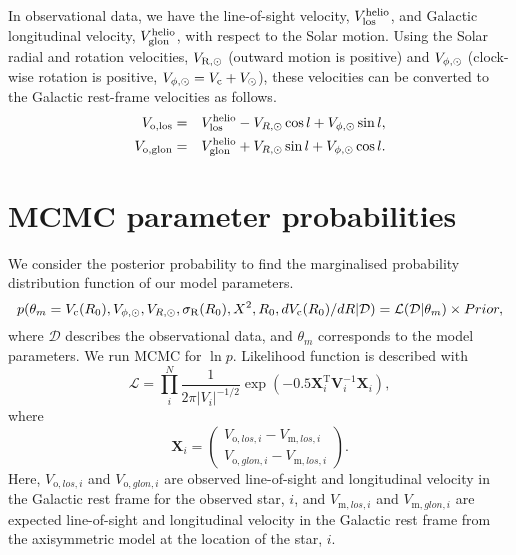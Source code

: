 \documentclass[11pt,a4paper]{article}
\begin{document}
In observational data, we have the line-of-sight velocity, $V_{\rm los}^{\rm helio}$, and Galactic longitudinal velocity, $V_{\rm glon}^{\rm helio}$, with respect to the Solar motion. Using the Solar radial and rotation velocities, $V_{\rm R,\odot}$ (outward motion is positive) and $V_{\rm \phi,\odot}$ (clock-wise rotation is positive, $V_{\rm \phi,\odot}=V_{\rm c}+V_{\odot}$), these velocities can be converted to the Galactic rest-frame velocities as follows.
\begin{eqnarray}
V_{\rm o,los} & = & V_{\rm los}^{\rm helio} - V_{R,\odot} \cos l + V_{\rm \phi,\odot} \sin l, \\
V_{\rm o,glon} & = & V_{\rm glon}^{\rm helio} + V_{R,\odot} \sin l + V_{\rm \phi,\odot} \cos l.
\end{eqnarray}

\section{MCMC parameter probabilities}

We consider the posterior probability to find the marginalised probability distribution function of our model parameters.
\begin{equation}
 p(\theta_m=V_{\rm c}(R_0), V_{\phi,\odot}, V_{R,\odot}, \sigma_{\rm R}(R_0), X^2, R_0, dV_{\rm c}(R_0)/dR| \mathcal{D})
 = \mathcal L(\mathcal{D}|\theta_m) \times Prior,
\end{equation} 
where $\mathcal{D}$ describes the observational data, and $\theta_m$ corresponds to the model parameters. We run MCMC for $\ln p$. Likelihood function is described with 
\begin{equation}
\mathcal{L}=\prod_i^N \frac{1}{2 \pi |V_i|^{-1/2}} 
 \exp\left(-0.5 \bm{X}^{\mathrm T}_i \bm{V}_i^{-1} \bm{X}_i \right),
\end{equation}
where 
\begin{equation}
\bm{X}_i= \left(
 \begin{array}{c}
 V_{\mathrm o,los,i}-V_{\mathrm m,los,i} \\
 V_{\mathrm o,glon,i}-V_{\mathrm m,los,i} 
 \end{array} \right).
\end{equation}
Here, $V_{\mathrm o,los,i}$ and $V_{\mathrm o,glon,i}$ are observed line-of-sight and longitudinal velocity in the Galactic rest frame for the observed star, $i$, and $V_{\mathrm m,los,i}$ and $V_{\mathrm m,glon,i}$ are expected line-of-sight and longitudinal velocity in the Galactic rest frame from the axisymmetric model at the location of the star, $i$.
\end{document}
